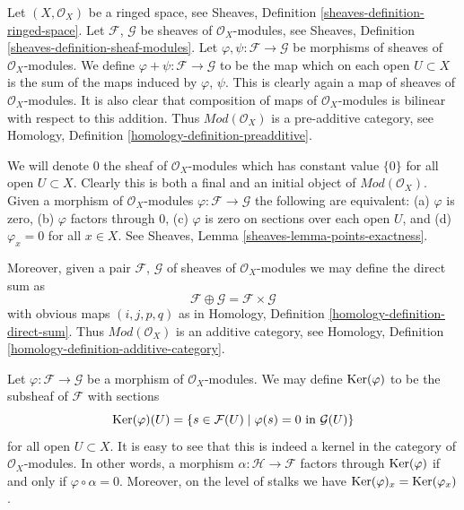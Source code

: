 \noindent
Let $(X, \mathcal{O}_X)$ be a ringed space, see
Sheaves, Definition \ref{sheaves-definition-ringed-space}.
Let $\mathcal{F}$, $\mathcal{G}$ be sheaves of $\mathcal{O}_X$-modules, see
Sheaves, Definition \ref{sheaves-definition-sheaf-modules}.
Let $\varphi, \psi : \mathcal{F} \to \mathcal{G}$
be morphisms of sheaves of $\mathcal{O}_X$-modules.
We define $\varphi + \psi : \mathcal{F} \to \mathcal{G}$
to be the map which on each open $U \subset X$ is the
sum of the maps induced by $\varphi$, $\psi$. This is
clearly again a map of sheaves of $\mathcal{O}_X$-modules.
It is also clear that composition of maps of
$\mathcal{O}_X$-modules is bilinear with respect to this
addition. Thus $\textit{Mod}(\mathcal{O}_X)$ is a pre-additive
category, see Homology, Definition \ref{homology-definition-preadditive}.

\medskip\noindent
We will denote $0$ the sheaf of $\mathcal{O}_X$-modules
which has constant value $\{0\}$ for all open $U \subset X$.
Clearly this is both a final and an initial object of
$\textit{Mod}(\mathcal{O}_X)$. Given a morphism
of $\mathcal{O}_X$-modules $\varphi : \mathcal{F} \to \mathcal{G}$
the following are equivalent:
(a) $\varphi$ is zero, (b) $\varphi$ factors through $0$,
(c) $\varphi$ is zero on sections over each open $U$, and
(d) $\varphi_x = 0$ for all $x \in X$. See
Sheaves, Lemma \ref{sheaves-lemma-points-exactness}.

\medskip\noindent
Moreover, given a pair
$\mathcal{F}$, $\mathcal{G}$ of sheaves of $\mathcal{O}_X$-modules
we may define the direct sum as
$$
\mathcal{F} \oplus \mathcal{G} = \mathcal{F} \times \mathcal{G}
$$
with obvious maps $(i, j, p, q)$ as in Homology, Definition
\ref{homology-definition-direct-sum}. Thus $\textit{Mod}(\mathcal{O}_X)$
is an additive category, see
Homology, Definition \ref{homology-definition-additive-category}.

\medskip\noindent
Let $\varphi : \mathcal{F} \to \mathcal{G}$ be a morphism
of $\mathcal{O}_X$-modules. We may define $\mathop{\mathrm{Ker}}(\varphi)$
to be the subsheaf of $\mathcal{F}$ with sections
$$
\mathop{\mathrm{Ker}}(\varphi)(U) =
\{ s \in \mathcal{F}(U) \mid \varphi(s) = 0 \text{ in } \mathcal{G}(U)\}
$$
for all open $U \subset X$. It is easy to see that this is indeed
a kernel in the category of $\mathcal{O}_X$-modules. In other words,
a morphism $\alpha : \mathcal{H} \to \mathcal{F}$ factors
through $\mathop{\mathrm{Ker}}(\varphi)$ if and only if $\varphi \circ \alpha = 0$.
Moreover, on the level of stalks we have
$\mathop{\mathrm{Ker}}(\varphi)_x = \mathop{\mathrm{Ker}}(\varphi_x)$.

